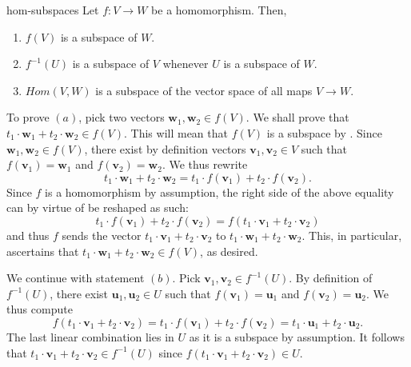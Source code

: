 \begin{lemma}{}{hom-subspaces}
 Let $f:V \to W$ be a homomorphism. Then,
 \begin{enumerate}[label=(\alph*)]
  \item $f(V)$ is a subspace of $W$.
  \item $f^{-1}(U)$ is a subspace of $V$ whenever $U$ is a subspace of $W$.
  \item $Hom(V,W)$ is a subspace of the vector space of all maps $V \to W$.
 \end{enumerate}
\end{lemma}
\begin{lemproof}
 To prove $(a)$, pick two vectors $\mathbf{w}_1,\mathbf{w}_2 \in f(V)$. We shall
 prove that $t_1 \cdot \mathbf{w}_1 + t_2 \cdot \mathbf{w}_2 \in f(V)$. This
 will mean that $f(V)$ is a subspace by
 . Since
 $\mathbf{w}_1,\mathbf{w}_2 \in f(V)$, there exist by definition vectors
 $\mathbf{v}_1,\mathbf{v}_2 \in V$ such that $f(\mathbf{v}_1) = \mathbf{w}_1$
 and $f(\mathbf{v}_2) = \mathbf{w}_2$. We thus rewrite
 \[
  t_1 \cdot \mathbf{w}_1 + t_2 \cdot \mathbf{w}_2 = t_1 \cdot f(\mathbf{v}_1) +
  t_2 \cdot f(\mathbf{v}_2).
 \]
 Since $f$ is a homomorphism by assumption, the right side of the above equality
 can by virtue of  be reshaped as such:
 \[
  t_1 \cdot f(\mathbf{v}_1) + t_2 \cdot f(\mathbf{v}_2) = f(t_1 \cdot
  \mathbf{v}_1 + t_2 \cdot \mathbf{v}_2)
 \]
 and thus $f$ sends the vector $t_1 \cdot \mathbf{v}_1 + t_2 \cdot \mathbf{v}_2$
 to $t_1 \cdot \mathbf{w}_1 + t_2 \cdot \mathbf{w}_2$. This, in particular,
 ascertains that $t_1 \cdot \mathbf{w}_1 + t_2 \cdot \mathbf{w}_2 \in f(V)$, as
 desired.

 We continue with statement $(b)$. Pick $\mathbf{v}_1,\mathbf{v}_2 \in
 f^{-1}(U)$. By definition of $f^{-1}(U)$, there exist
 $\mathbf{u}_1,\mathbf{u}_2 \in U$ such that $f(\mathbf{v}_1) = \mathbf{u}_1$
 and $f(\mathbf{v}_2) = \mathbf{u}_2$. We thus compute
 \[
  f(t_1 \cdot \mathbf{v}_1 + t_2 \cdot \mathbf{v}_2) = t_1 \cdot f(\mathbf{v}_1)
  + t_2 \cdot f(\mathbf{v}_2) = t_1 \cdot \mathbf{u}_1 + t_2 \cdot \mathbf{u}_2.
 \]
 The last linear combination lies in $U$ as it is a subspace by assumption. It
 follows that $t_1 \cdot \mathbf{v}_1 + t_2 \cdot \mathbf{v}_2 \in f^{-1}(U)$
 since $f(t_1 \cdot \mathbf{v}_1 + t_2 \cdot \mathbf{v}_2) \in U$.


\end{lemproof}
